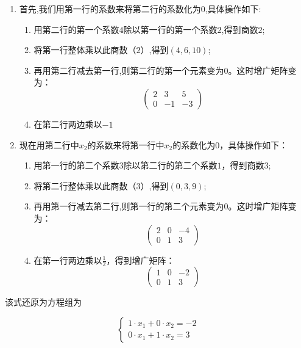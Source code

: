 \begin{enumerate}
    \item 首先,我们用第一行的系数来将第二行的系数化为$0$,具体操作如下:
    \begin{enumerate}
        \item 用第二行的第一个系数$4$除以第一行的第一个系数$2$,得到商数$2$;
        \item 将第一行整体乘以此商数（$2$）,得到$(4,6,10)$;
        \item 再用第二行减去第一行,则第二行的第一个元素变为$0$。这时增广矩阵变为：
        \begin{equation}
            \left(\begin{array}{cc|c}
        2 & 3 & 5 \\
        0 & -1 & -3
        \end{array}\right)
        \label{eq:行阶梯形矩阵}
        \end{equation}
        \item 在第二行两边乘以$-1$
    \end{enumerate}
    \item 现在用第二行中$x_2$的系数来将第一行中$x_2$的系数化为$0$，具体操作如下：
    \begin{enumerate}
        \item 用第一行的第二个系数$3$除以第二行的第二个系数$1$，得到商数$3$;
        \item 将第二行整体乘以此商数（$3$）,得到$(0,3,9)$;
        \item 再用第一行减去第二行,则第一行的第二个元素变为$0$。这时增广矩阵变为：
        \[
        \left(\begin{array}{cc|c}
        2 & 0 & -4 \\
        0 & 1 & 3
        \end{array}\right)
        \]
        \item 在第一行两边乘以$\frac{1}{2}$，得到增广矩阵：
        \begin{equation}
            \left(\begin{array}{cc|c}
        1 & 0 & -2 \\
        0 & 1 & 3
        \end{array}\right)
        \label{eq:简化行阶梯形矩阵}
        \end{equation}
    \end{enumerate}
\end{enumerate}

该式还原为方程组为

\[
\left\{
\begin{array}{l}
1 \cdot x_1 + 0 \cdot x_2 = -2\\
0 \cdot x_1 + 1\cdot x_2 = 3
\end{array}
\right.
\]


